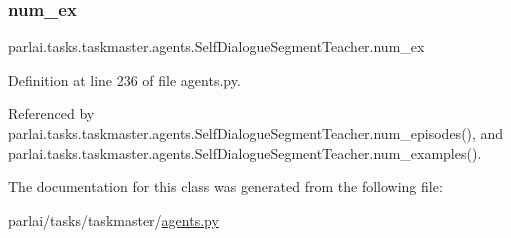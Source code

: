 \mbox{\label{classparlai_1_1tasks_1_1taskmaster_1_1agents_1_1SelfDialogueSegmentTeacher_a231381551fe76fdbf333c0fd8c671b5e}} 
\subsubsection{\texorpdfstring{num\+\_\+ex}{num\_ex}}
{\footnotesize\ttfamily parlai.\+tasks.\+taskmaster.\+agents.\+Self\+Dialogue\+Segment\+Teacher.\+num\+\_\+ex}



Definition at line 236 of file agents.\+py.



Referenced by parlai.\+tasks.\+taskmaster.\+agents.\+Self\+Dialogue\+Segment\+Teacher.\+num\+\_\+episodes(), and parlai.\+tasks.\+taskmaster.\+agents.\+Self\+Dialogue\+Segment\+Teacher.\+num\+\_\+examples().



The documentation for this class was generated from the following file\+:\begin{DoxyCompactItemize}
\item 
parlai/tasks/taskmaster/\hyperlink{parlai_2tasks_2taskmaster_2agents_8py}{agents.\+py}\end{DoxyCompactItemize}
